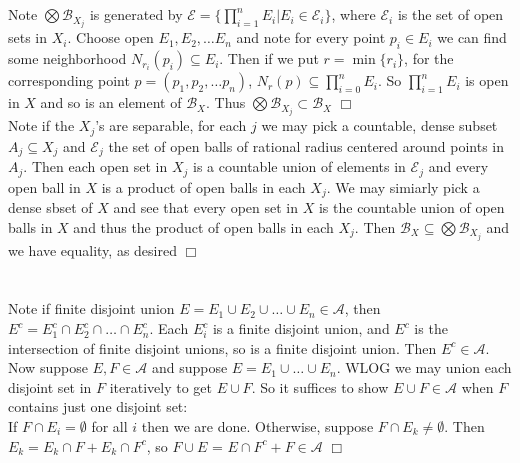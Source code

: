 \documentclass{article}
\begin{document}
\section{}
Note $\bigotimes \mathcal{B}_{X_j}$ is generated by $\mathcal{E} = \{ \prod\limits_{i=1}^n E_i | E_i \in \mathcal{E}_i \}$, where $\mathcal{E}_i$ is the set of open sets in $X_i$. Choose open $E_1, E_2, \dots E_n$ and note for every point $p_i \in E_i$ we can find some neighborhood $N_{r_i} (p_i) \subseteq E_i$. Then if we put $r = \min \{r_i\}$, for the corresponding point $p = (p_1,p_2,\dots p_n)$, $N_r(p) \subseteq \prod\limits_{i=0}^n E_i$. So $\prod\limits_{i=1}^n E_i$ is open in $X$ and so is an element of $\mathcal{B}_X$. Thus $\bigotimes \mathcal{B}_{X_j} \subset \mathcal{B}_X$ $\Box$\\
Note if the $X_j$'s are separable, for each $j$ we may pick a countable, dense subset $A_j \subseteq X_j$ and $\mathcal{E}_j$ the set of open balls of rational radius centered around points in $A_j$. Then each open set in $X_j$ is a countable union of elements in $\mathcal{E}_j$ and every open ball in $X$ is a product of open balls in each $X_j$. We may simiarly pick a dense sbset of $X$ and see that every open set in $X$ is the countable union of open balls in $X$ and thus the product of open balls in each $X_j$. Then $\mathcal{B}_X \subseteq \bigotimes \mathcal{B}_{X_j}$ and we have equality, as desired $\Box$

\section{}
Note if finite disjoint union $E = E_1 \cup E_2 \cup \dots \cup E_n \in \mathcal{A}$, then $E^c = E_1^c \cap E_2^c \cap \dots \cap E_n^c$. Each $E_i^c$ is a finite disjoint union, and $E^c$ is the intersection of finite disjoint unions, so is a finite disjoint union. Then $E^c \in \mathcal{A}$.\\
Now suppose $E,F \in \mathcal{A}$ and suppose $E = E_1 \cup \dots \cup E_n$. WLOG we may union each disjoint set in $F$ iteratively to get $E\cup F$. So it suffices to show $E\cup F \in \mathcal{A}$ when $F$ contains just one disjoint set:\\
If $F\cap E_i = \emptyset$ for all $i$ then we are done. Otherwise, suppose $F \cap E_k \neq \emptyset$. Then $E_k = E_k \cap F + E_k \cap F^c$, so $F \cup E$ = $E \cap F^c + F \in \mathcal{A}$ $\Box$ 

\section{}
\end{document}
